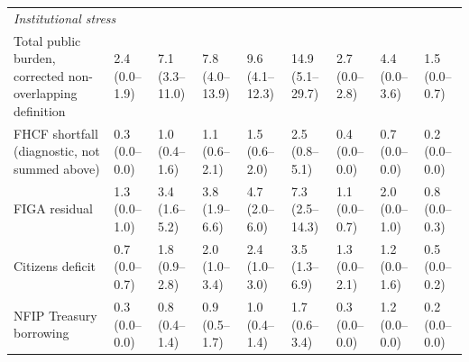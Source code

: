 \documentclass[fleqn,10pt]{wlscirep}
\begin{document}
\begin{landscape}
\begin{table}[htb!]
\begin{tabular}{@{}l|l|llll|lll@{}}
\midrule
\multicolumn{9}{l}{\textit{Institutional stress}} \\
Total public burden, corrected non-overlapping definition & 2.4 (0.0--1.9) & 7.1 (3.3--11.0) & 7.8 (4.0--13.9) & 9.6 (4.1--12.3) & 14.9 (5.1--29.7) & 2.7 (0.0--2.8) & 4.4 (0.0--3.6) & 1.5 (0.0--0.7) \\
FHCF shortfall (diagnostic, not summed above) & 0.3 (0.0--0.0) & 1.0 (0.4--1.6) & 1.1 (0.6--2.1) & 1.5 (0.6--2.0) & 2.5 (0.8--5.1) & 0.4 (0.0--0.0) & 0.7 (0.0--0.0) & 0.2 (0.0--0.0) \\
FIGA residual                      & 1.3 (0.0--1.0) & 3.4 (1.6--5.2) & 3.8 (1.9--6.6) & 4.7 (2.0--6.0) & 7.3 (2.5--14.3) & 1.1 (0.0--0.7) & 2.0 (0.0--1.0) & 0.8 (0.0--0.3) \\
Citizens deficit                   & 0.7 (0.0--0.7) & 1.8 (0.9--2.8) & 2.0 (1.0--3.4) & 2.4 (1.0--3.0) & 3.5 (1.3--6.9) & 1.3 (0.0--2.1) & 1.2 (0.0--1.6) & 0.5 (0.0--0.2) \\
NFIP Treasury borrowing            & 0.3 (0.0--0.0) & 0.8 (0.4--1.4) & 0.9 (0.5--1.7) & 1.0 (0.4--1.4) & 1.7 (0.6--3.4) & 0.3 (0.0--0.0) & 1.2 (0.0--0.0) & 0.2 (0.0--0.0) \\

\bottomrule
\end{tabular}
\end{table}

\begin{table}[htb!]
\centering
\caption{\textbf{Probabilistic exceedance of systemic insurance stress thresholds across climate and policy scenarios.}
Annual exceedance probabilities (percent) of systemic stress thresholds for private insurers, public and quasi-public institutions, and aggregate fiscal impact, estimated from \num{10000} simulated tropical cyclone seasons. Results are shown for present-day conditions, mid-century (2050) and end-of-century (2100) climate scenarios under SSP2-4.5 and SSP5-8.5, as well as illustrative market and policy interventions evaluated under present-day climate forcing. Values denote mean probabilities, with uncertainty ranges (10th--90th percentile) in parentheses.}
\label{TabSystemicRiskProb}


\end{table}
\end{landscape}
\end{document}
